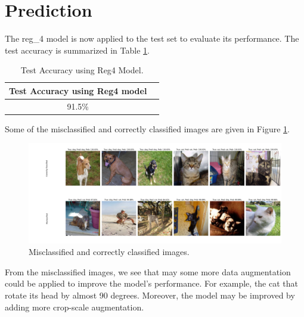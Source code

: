 \section{Prediction}
The reg\_4 model is now applied to the test set to evaluate its performance. The test accuracy is summarized in Table \ref{tab:prediction}.

\begin{table}[H]
    \centering
    \begin{tabular}{|c|c|}
        \hline
        \textbf{Test Accuracy using Reg4 model} \\ \hline
        91.5\% \\ \hline
    \end{tabular}
    \caption{Test Accuracy using Reg4 Model.}
    \label{tab:prediction}
\end{table}

Some of the misclassified and correctly classified images are given in Figure \ref{fig:prediction}.
\begin{figure}[H]
    \vspace*{-0.7cm}
    \centering
    \includegraphics[width=1\textwidth]{figures/predict_images.png}
    \caption{Misclassified and correctly classified images.}
    \label{fig:prediction}
    \vspace*{-0.7cm}
\end{figure}

From the misclassified images, we see that may some more data augmentation could be applied to improve the model's performance. For example, the cat that rotate its head by almost 90 degrees. Moreover, the model may be improved by adding more crop-scale augmentation.